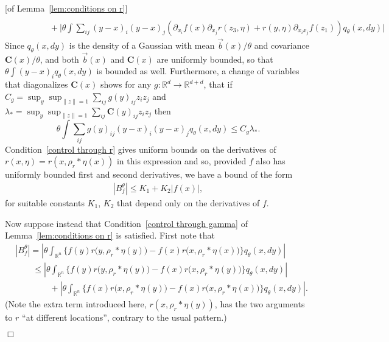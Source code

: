 \documentclass[12pt]{article}
\newenvironment {proof}{{\noindent\bf Proof }}{\hfill $\Box$ \medskip}
\newcommand{\IR}{\mathbb R}
\newcommand{\meanq}{\vec b}    %
\newcommand{\covq}{\mathbf{C}}     %
\newcommand{\kernel}{\rho}  %
\newcommand{\smooth}[1]{\kernel_{#1} \! * \!}  %
\numberwithin{equation}{section}
\begin{document}
\begin{proof}[of Lemma~\ref{lem:conditions on r}]
\begin{align*}
\\ &\qquad \qquad {} +
    \bigg| \theta \int \sum_{ij} (y-x)_i (y-x)_j 
        \left(
            \partial_{x_i} f(x) \partial_{x_j} r(z_3,\eta)
            + r(y,\eta) \partial_{x_ix_j} f(z_1)
        \right) q_\theta(x, dy) \bigg|
\end{align*}
Since $q_\theta(x,dy)$ is the density of a Gaussian with mean $\meanq(x)/\theta$
and covariance $\covq(x)/\theta$, and both $\meanq(x)$ and $\covq(x)$ are uniformly bounded,
so that $\theta \int (y-x)_i q_\theta(x,dy)$ is bounded as well.
Furthermore, a change of variables that diagonalizes $\covq(x)$
shows for any $g : \IR^d \to \IR^{d + d}$,
that if $C_g = \sup_y \sup_{\|z\| = 1} \sum_{ij} g(y)_{ij} z_i z_j$
and $\lambda_* = \sup_y \sup_{\|z\|=1} \sum_{ij} \covq(y)_{ij} z_i z_j$
then
$$ \theta \int \sum_{ij} g(y)_{ij} (y-x)_i (y-x)_j q_\theta(x, dy) \le C_g \lambda_* .  $$
Condition~\ref{control through r} 
gives uniform bounds on the derivatives of $r(x,\eta) = r(x,\rho_r*\eta(x))$
in this expression and so, provided $f$ also has uniformly bounded first and second derivatives,
we have a bound of the form
\begin{align*}
    |B^\theta_f| \leq K_1 + K_2 |f(x)| ,
\end{align*}
for suitable constants $K_1$, $K_2$ that depend only on the derivatives of $f$.

Now suppose instead that
Condition~\ref{control through gamma} of Lemma~\ref{lem:conditions on r} is satisfied.
First note that
\begin{align}
	    \nonumber
    & |B_f^\theta| =
        \left| \theta 
            \int_{\IR^n} 
                \big\{
                    f(y) r\big(y,\smooth{r}\eta(y)\big)
                    -
                    f(x) r\big(x,\smooth{r}\eta(x)\big)
                \big\}
            q_{\theta}(x,dy)
        \right|
    \\ 
 \label{eqn:q_bound_split}
	    &\qquad {} \leq
        \left| \theta 
            \int_{\IR^n} 
                \big\{
                    f(y) r\big(y,\smooth{r}\eta(y)\big)
                    -
                    f(x) r\big(x,\smooth{r}\eta(y)\big)
                \big\}
            q_{\theta}(x,dy)
        \right|
    \\ 
\nonumber
	    &\qquad \qquad {}  +
        \left| \theta 
            \int_{\IR^n} 
                \big\{
                    f(x) r\big(x,\smooth{r}\eta(y)\big)
                    -
                    f(x) r\big(x,\smooth{r}\eta(x)\big)
                \big\}
            q_{\theta}(x,dy) 
        \right| .
\end{align}
(Note the extra term introduced here,
$r(x,\smooth{r}\eta(y))$, has the two arguments to $r$
``at different locations'', contrary to the usual pattern.)



\end{proof}
\end{document}
